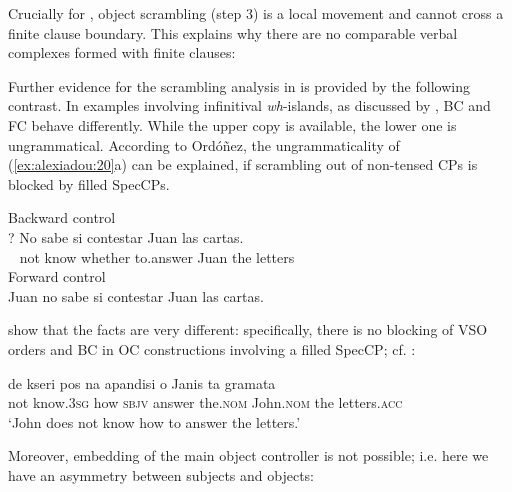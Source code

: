 \documentclass[output=paper]{langsci/langscibook}
\begin{document}
Crucially for \citet{Ordóñez2009}, object scrambling (step 3) is a local movement and cannot cross a finite clause boundary. This explains why there are no comparable verbal complexes formed with finite clauses:

\ea%
    \label{ex:alexiadou:19}
    \z
\z
    
Further evidence for the scrambling analysis in  is provided by the following contrast. In examples involving infinitival \textit{wh}-islands, as discussed by \citet{Torrego1996}, BC and FC behave differently. While the upper copy is available, the lower one is ungrammatical. According to Ordóñez, the ungrammaticality of (\ref{ex:alexiadou:20}a) can be explained, if scrambling out of non-tensed CPs is blocked by filled SpecCPs.

\ea%
    \label{ex:alexiadou:20}
    \ea Backward control\\
    \gll*? No sabe   si   contestar Juan las cartas. \\
         ~    not   know whether to.answer Juan the letters\\
    \ex Forward control\\Juan no sabe si contestar Juan las cartas.
    \z
\z
           

\citet{Tsakali2017} show that the  facts are very different: specifically, there is no blocking of VSO orders and BC in OC constructions involving a filled SpecCP; cf. :

\ea%
    \label{ex:alexiadou:21}
    \gll de kseri          pos na apandisi     o Janis   ta gramata    \\
          not know{}.\textsc{3sg} how \textsc{sbjv} answer   the.\textsc{nom} John{}.\textsc{nom}   the letters{}.\textsc{acc}\\
    \glt  ‘John does not know how to answer the letters.’
    \z

Moreover, embedding of the main object controller is not possible; i.e. here we have an asymmetry between subjects and objects:
\end{document}
